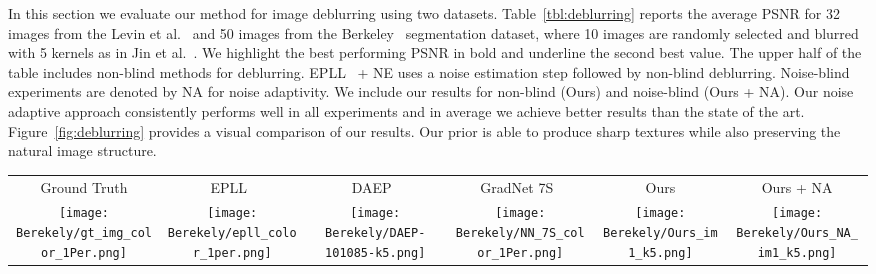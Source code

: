 \documentclass{article}
\begin{document}
In this section we evaluate our method for image deblurring using two datasets.
Table~\ref{tbl:deblurring} reports the average PSNR for 32 images from the Levin et al.~\cite{levin2007image} and 50 images from the Berkeley~\cite{arbelaez2011contour} segmentation dataset, where 10 images are randomly selected and blurred with 5 kernels as in  Jin et al.~\cite{Jin:2017:NBD}.
We highlight the best performing PSNR in bold and underline the second best value.
The upper half of the table includes non-blind methods for deblurring. EPLL~\cite{Zoran:2011:LMN} + NE uses a noise estimation step followed by non-blind deblurring.
Noise-blind experiments are denoted by NA for noise adaptivity.
We include our results for non-blind (Ours) and noise-blind (Ours + NA).
Our noise adaptive approach consistently performs well in all experiments and in average we achieve better results than the state of the art.
Figure~\ref{fig:deblurring} provides a visual comparison of our results.
Our prior is able to produce sharp textures while also preserving the natural image structure.


\begin{figure*}[t]
\centering
\bgroup
\setlength{\tabcolsep}{2pt}
\begin{tabular}{cccccc}
Ground Truth & EPLL~\cite{Zoran:2011:LMN} & DAEP~\cite{bigdeli2017image} & GradNet 7S~\cite{Jin:2017:NBD} & Ours & Ours + NA \\
\texttt{[image: Berekely/gt\_img\_color\_1Per.png]} &
\texttt{[image: Berekely/epll\_color\_1per.png]} &
\texttt{[image: Berekely/DAEP-101085-k5.png]} &
\texttt{[image: Berekely/NN\_7S\_color\_1Per.png]} &
\texttt{[image: Berekely/Ours\_im1\_k5.png]} &
\texttt{[image: Berekely/Ours\_NA\_im1\_k5.png]} \\
\end{tabular}
\egroup
\caption{
Visual comparison of our deconvolution results.
}
\label{fig:deblurring}
\end{figure*}
\end{document}
